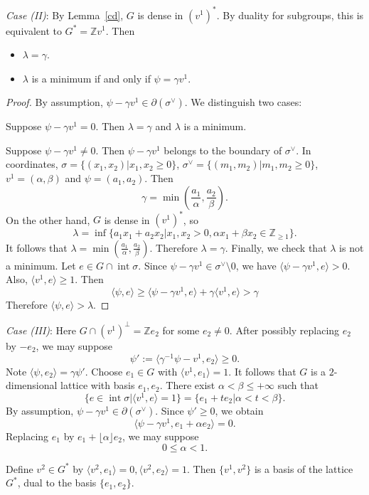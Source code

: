 \documentclass[12pt,reqno]{amsart}
\newcommand{\Z}{{\mathbb Z}}
\newcommand{\Int}{\operatorname{int}}
\theoremstyle{plain}
\theoremstyle{definition}
\theoremstyle{remark}
\begin{document}
{\em Case (II)}: By Lemma~\ref{cd}, $G$ is dense in 
$(v^1)^*$. By duality for subgroups, this is equivalent to 
$G^*=\Z v^1$. Then
\begin{itemize}
\item $\lambda=\gamma$.
\item $\lambda$ is a minimum if and only if $\psi=\gamma v^1$.
\end{itemize}

\begin{proof}
By assumption, $\psi-\gamma v^1\in \partial(\sigma^\vee)$. We distinguish two cases:

Suppose $\psi-\gamma v^1=0$. Then $\lambda=\gamma$ and $\lambda$ is
a minimum.

Suppose $\psi-\gamma v^1\ne 0$. Then $\psi-\gamma v^1$ belongs to the boundary of $\sigma^\vee$. In coordinates,
$\sigma=\{(x_1,x_2) \vert x_1,x_2\ge 0\}$,
$\sigma^\vee=\{(m_1,m_2) \vert m_1,m_2\ge 0\}$, $v^1=(\alpha,\beta)$
and $\psi=(a_1,a_2)$. Then 
$$
\gamma=\min(\frac{a_1}{\alpha},\frac{a_2}{\beta}). 
$$
On the other hand, $G$ is dense in $(v^1)^*$, so 
$$
\lambda=\inf\{a_1x_1+a_2x_2 \vert x_1,x_2>0,\alpha x_1+\beta x_2\in \Z_{\ge 1} \}.
$$
It follows that $\lambda=\min(\frac{a_1}{\alpha},\frac{a_2}{\beta})$.
Therefore $\lambda=\gamma$. Finally, we check that $\lambda$ is
not a minimum. Let $e\in G\cap \Int \sigma$. 
Since $\psi-\gamma v^1\in \sigma^\vee\setminus 0$,
we have $\langle \psi-\gamma v^1,e\rangle>0$. 
Also, $\langle v^1,e\rangle\ge 1$. Then
$$
\langle \psi,e\rangle\ge \langle \psi-\gamma v^1,e\rangle+
\gamma \langle v^1,e\rangle>\gamma
$$
Therefore $\langle \psi,e\rangle>\lambda$.
\end{proof}

{\em Case (III)}: Here $G\cap (v^1)^\perp=\Z e_2$ for some $e_2\ne 0$.
After possibly replacing $e_2$ by $-e_2$, we may suppose 
$$
\psi':=\langle \gamma^{-1}\psi- v^1,e_2\rangle\ge 0.
$$
Note $\langle \psi,e_2\rangle=\gamma\psi'$. Choose $e_1\in G$ with $\langle v^1,e_1\rangle=1$. 
It follows that $G$ is a $2$-dimensional lattice with basis $e_1,e_2$.
There exist $\alpha<\beta\le +\infty$ such that 
$$
\{e\in \Int \sigma \vert \langle v^1,e\rangle=1\}=\{e_1+te_2 \vert \alpha<t<\beta\}.
$$
By assumption, $\psi-\gamma v^1\in \partial(\sigma^\vee)$. Since $\psi' \ge 0$, we obtain 
$$
\langle \psi-\gamma v^1,e_1+\alpha e_2\rangle =0.
$$
Replacing $e_1$ by $e_1+\lfloor \alpha\rfloor e_2$, we may suppose 
$$
0\le \alpha<1.
$$

Define $v^2\in G^*$ by $\langle v^2,e_1\rangle=0,\langle v^2,e_2\rangle=1$.
Then $\{v^1,v^2\}$ is a basis of the lattice $G^*$, dual to the basis 
$\{e_1,e_2\}$.
\end{document}

